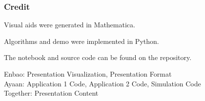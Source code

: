 \documentclass{beamer}
\begin{document}
\begin{frame}
\frametitle{Credit}

Visual aids were generated in Mathematica.
\vspace{0.5cm}

Algorithms and demo were implemented in Python. 
\vspace{0.5cm}

The notebook and source code can be found on the repository.
\vspace{0.5cm}

Enbao: Presentation Visualization, Presentation Format
\\
Ayaan: Application 1 Code, Application 2 Code, Simulation Code
\\
Together: Presentation Content

\vspace{0.5cm}

\end{frame}
\end{document}

